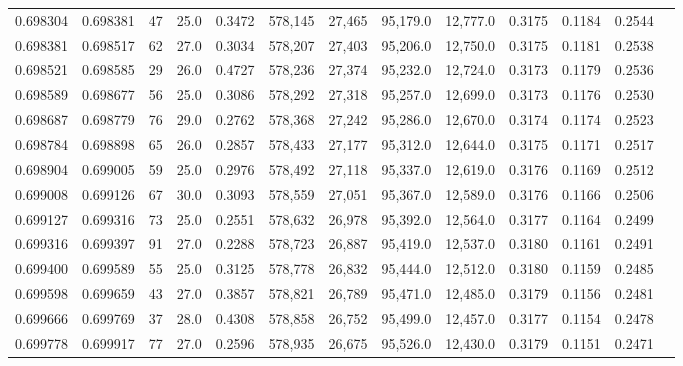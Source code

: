 \begin{tabular}{rrrrrrrrrrrrr}
0.698304 & 0.698381 &    47 & 25.0 &                                     0.3472 & 578,145 &  27,465 &  95,179.0 &  12,777.0 & 0.3175 & 0.1184 & 0.2544 \\
0.698381 & 0.698517 &    62 & 27.0 &                                     0.3034 & 578,207 &  27,403 &  95,206.0 &  12,750.0 & 0.3175 & 0.1181 & 0.2538 \\
0.698521 & 0.698585 &    29 & 26.0 &                                     0.4727 & 578,236 &  27,374 &  95,232.0 &  12,724.0 & 0.3173 & 0.1179 & 0.2536 \\
0.698589 & 0.698677 &    56 & 25.0 &                                     0.3086 & 578,292 &  27,318 &  95,257.0 &  12,699.0 & 0.3173 & 0.1176 & 0.2530 \\
0.698687 & 0.698779 &    76 & 29.0 &                                     0.2762 & 578,368 &  27,242 &  95,286.0 &  12,670.0 & 0.3174 & 0.1174 & 0.2523 \\
0.698784 & 0.698898 &    65 & 26.0 &                                     0.2857 & 578,433 &  27,177 &  95,312.0 &  12,644.0 & 0.3175 & 0.1171 & 0.2517 \\
0.698904 & 0.699005 &    59 & 25.0 &                                     0.2976 & 578,492 &  27,118 &  95,337.0 &  12,619.0 & 0.3176 & 0.1169 & 0.2512 \\
0.699008 & 0.699126 &    67 & 30.0 &                                     0.3093 & 578,559 &  27,051 &  95,367.0 &  12,589.0 & 0.3176 & 0.1166 & 0.2506 \\
0.699127 & 0.699316 &    73 & 25.0 &                                     0.2551 & 578,632 &  26,978 &  95,392.0 &  12,564.0 & 0.3177 & 0.1164 & 0.2499 \\
0.699316 & 0.699397 &    91 & 27.0 &                                     0.2288 & 578,723 &  26,887 &  95,419.0 &  12,537.0 & 0.3180 & 0.1161 & 0.2491 \\
0.699400 & 0.699589 &    55 & 25.0 &                                     0.3125 & 578,778 &  26,832 &  95,444.0 &  12,512.0 & 0.3180 & 0.1159 & 0.2485 \\
0.699598 & 0.699659 &    43 & 27.0 &                                     0.3857 & 578,821 &  26,789 &  95,471.0 &  12,485.0 & 0.3179 & 0.1156 & 0.2481 \\
0.699666 & 0.699769 &    37 & 28.0 &                                     0.4308 & 578,858 &  26,752 &  95,499.0 &  12,457.0 & 0.3177 & 0.1154 & 0.2478 \\
0.699778 & 0.699917 &    77 & 27.0 &                                     0.2596 & 578,935 &  26,675 &  95,526.0 &  12,430.0 & 0.3179 & 0.1151 & 0.2471 \\

\end{tabular}
